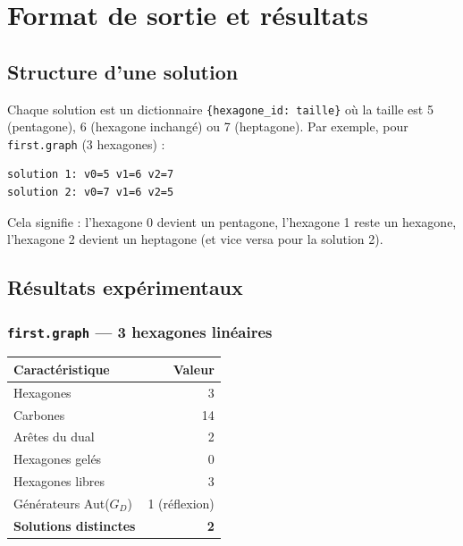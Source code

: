 \documentclass[12pt,a4paper]{article}
\theoremstyle{definition}
\newcommand{\GD}{G_{\!D}}
\begin{document}
\section{Format de sortie et résultats}

\subsection{Structure d'une solution}

Chaque solution est un dictionnaire \texttt{\{hexagone\_id: taille\}} où la taille est 5
(pentagone), 6 (hexagone inchangé) ou 7 (heptagone). Par exemple, pour \texttt{first.graph}
(3 hexagones) :

\begin{lstlisting}[style=benzai]
solution 1: v0=5 v1=6 v2=7
solution 2: v0=7 v1=6 v2=5
\end{lstlisting}

Cela signifie : l'hexagone 0 devient un pentagone, l'hexagone 1 reste un hexagone,
l'hexagone 2 devient un heptagone (et vice versa pour la solution 2).

\subsection{Résultats expérimentaux}

\subsubsection{\texttt{first.graph} — 3 hexagones linéaires}

\begin{center}
\begin{tabular}{lr}
  \toprule
  Caractéristique & Valeur \\
  \midrule
  Hexagones & 3 \\
  Carbones & 14 \\
  Arêtes du dual & 2 \\
  Hexagones gelés & 0 \\
  Hexagones libres & 3 \\
  Générateurs Aut($\GD$) & 1 (réflexion) \\
  \textbf{Solutions distinctes} & \textbf{2} \\
  \bottomrule
\end{tabular}
\end{center}
\end{document}
